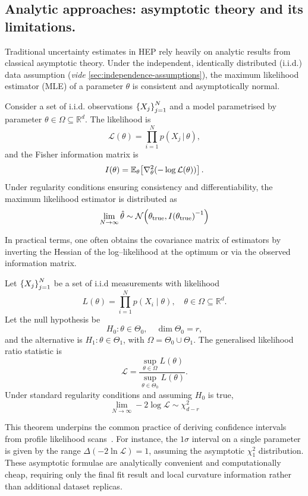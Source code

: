     \subsection{Analytic approaches: asymptotic theory and its limitations.}
        Traditional uncertainty estimates in HEP rely heavily on analytic results from classical asymptotic theory.
        Under the independent, identically distributed (i.i.d.) data assumption (\textit{vide} \cref{sec:independence-assumptions}), the maximum likelihood estimator (MLE) of a parameter $\theta$ is consistent and asymptotically normal.
\begin{theorem}
\noproofref
    Consider a set of i.i.d. observations \(\qty{X_j}_{j = 1}^N\) and a model parametrised by parameter \(\theta\in\Omega\subseteq\mathbb{R}^{d}\). The likelihood is
    \[
        \mathcal L(\theta) =\prod_{i=1}^{N} p(X_{j}\, | \,\theta),
    \] and the Fisher information matrix is
    \[
        I(\theta) =\mathbb{E}_{\theta}\qty[\laplacian_{\theta}(-\log\mathcal L(\theta))]\,.
    \]
Under regularity conditions ensuring consistency and differentiability,
the maximum likelihood estimator is distributed as
\[
    \lim_{N\to\infty} \hat\theta \sim \mathcal N\qty(\theta_{\text{true}}, I\qty(\theta_{\text{true}})^{-1})
\]
\end{theorem}
        
        In practical terms, one often obtains the covariance matrix of estimators by inverting the Hessian of the log--likelihood at the optimum or via the observed information matrix.
        
\begin{theorem}
\noproofref
    Let \(\qty{X_j}_{j=1}^N\) be a set of i.i.d measurements with likelihood
    \[
        L(\theta)=\prod_{i=1}^{N}p(X_{i}\mid\theta), \quad \theta\in\Omega\subseteq\mathbb{R}^{d}.
    \]
    Let the null hypothesis be
    \[
        H_{0}:\theta\in\Theta_{0},\quad \dim\Theta_{0}=r,
    \]
    and the alternative is \(H_{1}:\theta\in\Theta_{1}\), with \(\Omega=\Theta_{0}\cup\Theta_{1}\). The generalised likelihood ratio statistic is
    \[
        \mathcal L = \frac{\sup_{\theta\in\Omega}L(\theta)}
            {\sup_{\theta\in\Theta_{0}}L(\theta)}.
    \]
    Under standard regularity conditions and assuming \(H_{0}\) is true, 
    \[
        \lim_{N\to\infty} -2\log \mathcal L \sim\chi^2_{d-r}
    \]
\end{theorem}
        This theorem underpins the common practice of deriving confidence intervals from profile likelihood scans~\cite{Cowan:2010js, Algeri:2019lah, Canonero:2023sua, Frate:2017mai, Ansarifard:2025hec}.
        For instance, the $1\sigma$ interval on a single parameter is given by the range $\Delta(-2\ln\mathcal{L}) = 1$, assuming the asymptotic $\chi^2_1$ distribution.
        These asymptotic formulae are analytically convenient and computationally cheap, requiring only the final fit result and local curvature information rather than additional dataset replicas.

